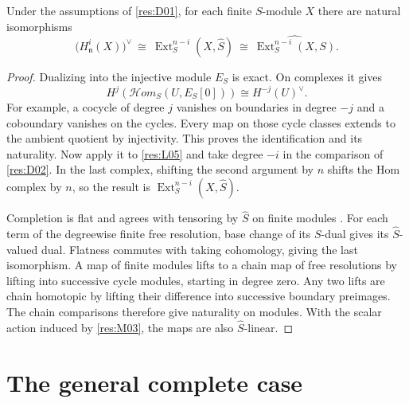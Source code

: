 \begin{theorem}\label{res:D03}
Under the assumptions of \ref{res:D01}, for each finite
$S$-module $X$ there are natural isomorphisms
\[
 \bigl(H^i_{\mathfrak n}(X)\bigr)^\vee
   \ \cong\ \operatorname{Ext}^{n-i}_S(X,\widehat S)
   \ \cong\ \widehat{\operatorname{Ext}^{n-i}_S(X,S)} .
\]
\end{theorem}
\begin{proof}
Dualizing into the injective module $E_S$ is exact. On complexes it gives
\[
     H^j(\mathcal H om_S(U,E_S[0]))\cong H^{-j}(U)^\vee.
\]
For example, a cocycle of degree $j$ vanishes on boundaries in
degree $-j$ and a coboundary vanishes on the cycles. Every map on
those cycle classes extends to the ambient quotient by injectivity.
This proves the identification and its naturality. Now apply it to
\ref{res:L05} and take degree $-i$ in the comparison of
\ref{res:D02}. In the last complex, shifting the second argument
by $n$ shifts the Hom complex by $n$, so the result is
$\operatorname{Ext}^{n-i}_S(X,\widehat S)$.

Completion is flat and agrees with tensoring by $\widehat S$ on
finite modules \cite[ALG-05-C04-R03 and S01]{p103}. For each term
of the degreewise finite free resolution, base change of its
$S$-dual gives its $\widehat S$-valued dual. Flatness commutes with
taking cohomology, giving the last isomorphism. A map of finite
modules lifts to a chain map of free resolutions by lifting into
successive cycle modules, starting in degree zero. Any two lifts
are chain homotopic by lifting their difference into successive
boundary preimages. The chain comparisons therefore give
naturality on modules. With the scalar action induced by
\ref{res:M03}, the maps are also $\widehat S$-linear.
\end{proof}

\section{The general complete case}

